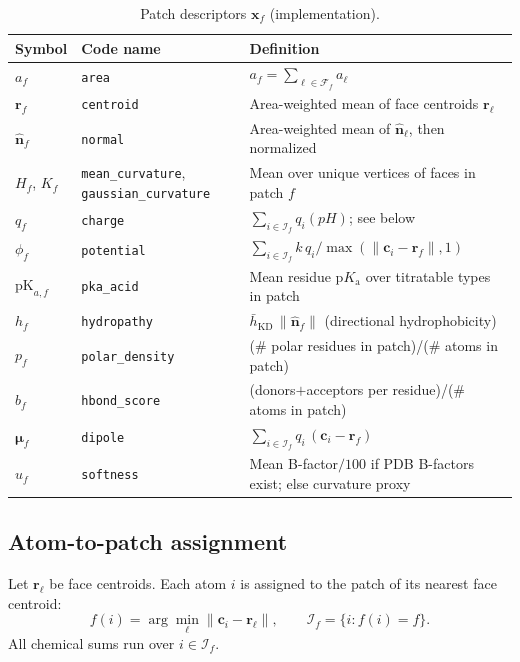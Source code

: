 \documentclass[11pt,a4paper]{article}
\begin{document}
\begin{table}[ht]
  \centering
  \caption{Patch descriptors $\mathbf{x}_f$ (implementation).}
  \label{tab:patch}
  \begin{tabular}{@{}llp{7.2cm}@{}}
    \toprule
    Symbol & Code name & Definition \\
    \midrule
    $a_f$ & \texttt{area}
      & $a_f=\sum_{\ell\in\mathcal{F}_f} a_\ell$ \\
    $\mathbf{r}_f$ & \texttt{centroid}
      & Area-weighted mean of face centroids $\mathbf{r}_\ell$ \\
    $\hat{\mathbf{n}}_f$ & \texttt{normal}
      & Area-weighted mean of $\hat{\mathbf{n}}_\ell$, then normalized \\
    $H_f$, $K_f$ & \texttt{mean\_curvature}, \texttt{gaussian\_curvature}
      & Mean over unique vertices of faces in patch $f$ \\
    $q_f$ & \texttt{charge}
      & $\sum_{i\in\mathcal{I}_f} q_i(pH)$; see below \\
    $\phi_f$ & \texttt{potential}
      & $\sum_{i\in\mathcal{I}_f} k\, q_i / \max(\|\mathbf{c}_i-\mathbf{r}_f\|,1)$ \\
    $\mathrm{pK}_{a,f}$ & \texttt{pka\_acid}
      & Mean residue p$K_\mathrm{a}$ over titratable types in patch \\
    $h_f$ & \texttt{hydropathy}
      & $\bar{h}_{\mathrm{KD}}\,\|\hat{\mathbf{n}}_f\|$ (directional hydrophobicity) \\
    $p_f$ & \texttt{polar\_density}
      & (\# polar residues in patch)/(\# atoms in patch) \\
    $b_f$ & \texttt{hbond\_score}
      & (donors$+$acceptors per residue)/(\# atoms in patch) \\
    $\boldsymbol{\mu}_f$ & \texttt{dipole}
      & $\sum_{i\in\mathcal{I}_f} q_i\,(\mathbf{c}_i-\mathbf{r}_f)$ \\
    $u_f$ & \texttt{softness}
      & Mean B-factor$/100$ if PDB B-factors exist; else curvature proxy \\
    \bottomrule
  \end{tabular}
\end{table}

\subsection{Atom-to-patch assignment}

Let $\mathbf{r}_\ell$ be face centroids. Each atom $i$ is assigned to the patch of
its nearest face centroid:
\begin{equation}
  f(i) = \arg\min_\ell \|\mathbf{c}_i - \mathbf{r}_\ell\|,
  \qquad
  \mathcal{I}_f = \{ i : f(i)=f \}.
\end{equation}
All chemical sums run over $i\in\mathcal{I}_f$.
\end{document}
